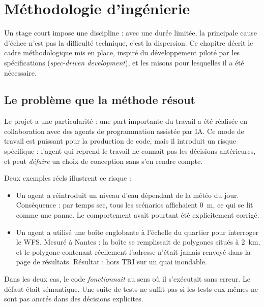 \chapter{Méthodologie d'ingénierie}
\label{ch:methodo}

Un stage court impose une discipline : avec une durée limitée, la principale
cause d'échec n'est pas la difficulté technique, c'est la dispersion. Ce
chapitre décrit le cadre méthodologique mis en place, inspiré du développement
piloté par les spécifications (\emph{spec-driven development}), et les raisons
pour lesquelles il a été nécessaire.

\section{Le problème que la méthode résout}

Le projet a une particularité : une part importante du travail a été réalisée
en collaboration avec des agents de programmation assistée par IA. Ce mode de
travail est puissant pour la production de code, mais il introduit un risque
spécifique : l'agent qui reprend le travail ne connaît pas les décisions
antérieures, et peut \emph{défaire} un choix de conception sans s'en rendre
compte.

Deux exemples réels illustrent ce risque :

\begin{itemize}[leftmargin=1.4em]
  \item Un agent a réintroduit un niveau d'eau dépendant de la météo du jour.
        Conséquence : par temps sec, tous les scénarios affichaient 0~m, ce qui
        se lit comme une panne. Le comportement avait pourtant été
        explicitement corrigé.
  \item Un agent a utilisé une boîte englobante à l'échelle du quartier pour
        interroger le WFS. Mesuré à Nantes : la boîte se remplissait de
        polygones situés à 2~km, et le polygone contenant réellement l'adresse
        n'était jamais renvoyé dans la page de résultats. Résultat : \og hors
        TRI \fg{} sur un quai inondable.
\end{itemize}

Dans les deux cas, le code \emph{fonctionnait} au sens où il s'exécutait sans
erreur. Le défaut était sémantique. Une suite de tests ne suffit pas si les
tests eux-mêmes ne sont pas ancrés dans des décisions explicites.

